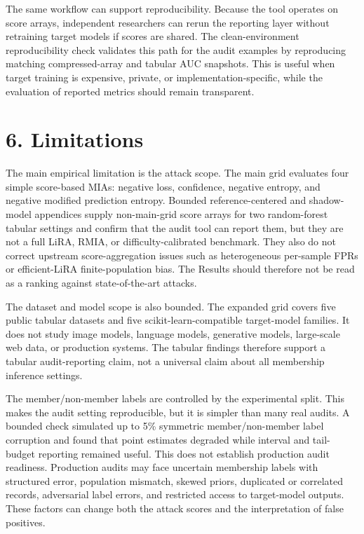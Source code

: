 \documentclass[
  10pt,
  twocolumn]{article}
\begin{document}
The same workflow can support reproducibility. Because the tool operates on score arrays, independent researchers can rerun the reporting layer without retraining target models if scores are shared. The clean-environment reproducibility check validates this path for the audit examples by reproducing matching compressed-array and tabular AUC snapshots. This is useful when target training is expensive, private, or implementation-specific, while the evaluation of reported metrics should remain transparent.

\hypertarget{limitations}{%
\section{6. Limitations}\label{limitations}}

The main empirical limitation is the attack scope. The main grid evaluates four simple score-based MIAs: negative loss, confidence, negative entropy, and negative modified prediction entropy. Bounded reference-centered and shadow-model appendices supply non-main-grid score arrays for two random-forest tabular settings and confirm that the audit tool can report them, but they are not a full LiRA, RMIA, or difficulty-calibrated benchmark. They also do not correct upstream score-aggregation issues such as heterogeneous per-sample FPRs or efficient-LiRA finite-population bias. The Results should therefore not be read as a ranking against state-of-the-art attacks.

The dataset and model scope is also bounded. The expanded grid covers five public tabular datasets and five scikit-learn-compatible target-model families. It does not study image models, language models, generative models, large-scale web data, or production systems. The tabular findings therefore support a tabular audit-reporting claim, not a universal claim about all membership inference settings.

The member/non-member labels are controlled by the experimental split. This makes the audit setting reproducible, but it is simpler than many real audits. A bounded check simulated up to 5\% symmetric member/non-member label corruption and found that point estimates degraded while interval and tail-budget reporting remained useful. This does not establish production audit readiness. Production audits may face uncertain membership labels with structured error, population mismatch, skewed priors, duplicated or correlated records, adversarial label errors, and restricted access to target-model outputs. These factors can change both the attack scores and the interpretation of false positives.
\end{document}
